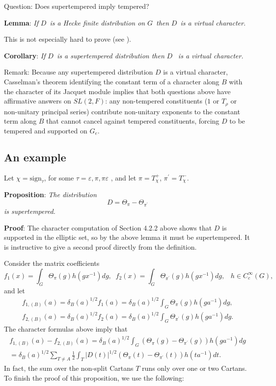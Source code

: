 \documentclass[11pt, a4paper]{article}
\begin{document}
{\sc Question}: Does supertempered imply tempered?

{\bf Lemma}: {\em If }$D${\em \ is a Hecke finite distribution on }$G${\em \
then }$D${\em \ is a virtual character.}

This is not especially hard to prove (see \cite[\S 3]{J}).

{\bf Corollary}: {\em If }$D${\em \ is a supertempered distribution then }$D$%
{\em \ is a virtual character.}

{\sc Remark}: Because any supertempered distribution $D$ is a virtual character, Casselman's theorem identifying the constant term of a character along $B$ with the character of its Jacquet module implies that both questions above have affirmative answers on $SL(2,F)$: any non-tempered constituents ($1$ or $T_\rho $ or non-unitary principal series) contribute non-unitary exponents to the constant term along $B$ that cannot cancel against tempered constituents, forcing $D$ to be tempered and supported on $G_e$.

\subsection{An example}

Let $\chi =\mathrm{sign}_\tau $, for some $\tau =\varepsilon ,\pi ,\pi \varepsilon $%
, and let $\pi =T_\chi ^{+}$, $\pi ^{\prime }=T_\chi ^{-}$.

{\bf Proposition}: {\em The distribution}
\[
D=\Theta _\pi -\Theta _{\pi ^{\prime }}
\]
{\em is supertempered.}

{\bf Proof}: The character computation of Section 4.2.2 above shows that $D$
is supported in the elliptic set, so by the above lemma it must be
supertempered. It is instructive to give a second proof directly from the
definition.

Consider the matrix coefficients
\[
f_1(x)=\int_G\Theta _\pi (g)h(gx^{-1})dg,\;\;f_2(x)=\int_G\Theta _{\pi
^{\prime }}(g)h(gx^{-1})dg,\;\;\;h\in C_c^\infty (G),
\]
and let
\[
\begin{array}{c}
f_{1,(B)}(a)=\delta _B(a)^{1/2}f_1(a)=\delta _B(a)^{1/2}\int_G\Theta _\pi
(g)h(ga^{-1})dg, \\ 
f_{2,(B)}(a)=\delta _B(a)^{1/2}f_2(a)=\delta _B(a)^{1/2}\int_G\Theta _{\pi
^{\prime }}(g)h(ga^{-1})dg.
\end{array}
\]
The character formulas above imply that
\[
\begin{array}{c}
f_{1,(B)}(a)-f_{2,(B)}(a)=\delta _B(a)^{1/2}\int_G(\Theta _\pi (g)-\Theta
_{\pi ^{\prime }}(g))h(ga^{-1})dg \\ 
=\delta _B(a)^{1/2}\sum_{T\neq A}\frac 12\int_T|D(t)|^{1/2}(\Theta _\pi
(t)-\Theta _{\pi ^{\prime }}(t))h(ta^{-1})dt.
\end{array}
\]
In fact, the sum over the non-split Cartans $T$ runs only over one or two
Cartans. To finish the proof of this proposition, we use the following:
\end{document}

